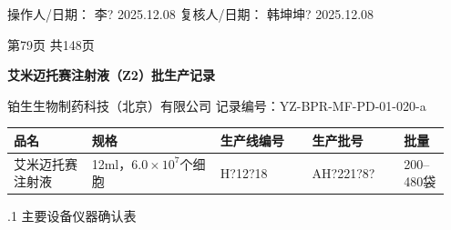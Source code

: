 \documentclass[UTF8,10pt,a4paper,fontset=fandol]{ctexart}
\newcommand{\fieldvalue}[1]{#1}
\newcommand{\handwritten}[1]{#1}
\begin{document}
\medskip

操作人/日期：%
\fieldvalue{\handwritten{李?}}\quad
\fieldvalue{\handwritten{2025.12.08}}
\hfill
复核人/日期：%
\fieldvalue{\handwritten{韩坤坤?}}\quad
\fieldvalue{\handwritten{2025.12.08}}

\bigskip

\begin{center}
第79页 共148页
\end{center}

\newpage

\begin{center}
{\Large \textbf{艾米迈托赛注射液（Z2）批生产记录}}
\end{center}

\noindent
铂生生物制药科技（北京）有限公司 \hfill 记录编号：YZ-BPR-MF-PD-01-020-a\\
\noindent
\begin{tabular}{|p{0.17\linewidth}|p{0.28\linewidth}|p{0.20\linewidth}|p{0.20\linewidth}|p{0.10\linewidth}|}
\hline
品名 & 规格 & 生产线编号 & 生产批号 & 批量\\
\hline
艾米迈托赛注射液 & 12ml，$6.0\times10^7$个细胞 &
\fieldvalue{\handwritten{H?12?18}} &
\fieldvalue{\handwritten{AH?221?8?}} &
200--480袋\\
\hline
\end{tabular}

\vspace{0.4em}
.1 主要设备仪器确认表
\end{document}
